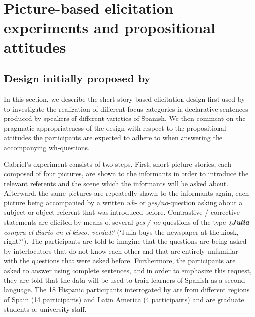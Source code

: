 \documentclass[output=paper]{langsci/langscibook}
\begin{document}
\section{Picture-based elicitation experiments and propositional attitudes}
\label{sec:uth:2}
\subsection{Design initially proposed by \citet{Gabriel2007}}
\label{sec:uth:2.1}
In this section, we describe the short story-based elicitation design first used by \citet{Gabriel2007} to investigate the realization of different focus categories in declarative sentences produced by speakers of different varieties of Spanish. We then comment on the pragmatic appropriateness of the design with respect to the propositional attitudes the participants are expected to adhere to when answering the accompanying wh-questions.

Gabriel’s \citeyearpar{Gabriel2007} experiment consists of two steps. First, short picture stories, each composed of four pictures, are shown to the informants in order to introduce the relevant referents and the scene which the informants will be asked about. Afterward, the same pictures are repeatedly shown to the informants again, each picture being accompanied by a written \textit{wh}- or \textit{yes/no}-question asking about a subject or object referent that was introduced before. Contrastive / corrective statements are elicited by means of several \textit{yes / no}-questions of the type \textit{¿\textbf{Julia} compra el diario en el kisco, verdad?} (‘Julia buys the newspaper at the kiosk, right?'). The participants are told to imagine that the questions are being asked by interlocutors that do not know each other and that are entirely unfamiliar with the questions that were asked before. Furthermore, the participants are asked to answer using complete sentences, and in order to emphasize this request, they are told that the data will be used to train learners of Spanish as a second language. The 18 Hispanic participants interrogated by \citet{Gabriel2007,Gabriel2010article} are from different regions of Spain (14 participants) and Latin America (4 participants) and are graduate students or university staff.
\end{document}
